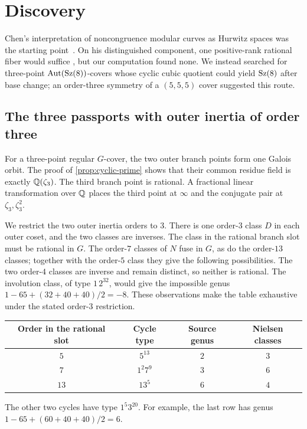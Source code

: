 \section{Discovery}\label{sec:construction}

Chen's interpretation of noncongruence modular curves as Hurwitz spaces
was the starting point~\cite[\S5.4]{Chen2025}. On his distinguished
component, one positive-rank rational fiber would suffice
\cite[Proposition~5.6 and the following remark]{Chen2025}, but our
computation found none. We instead searched for three-point
$\operatorname{Aut}(\operatorname{Sz}(8))$-covers whose cyclic cubic quotient could yield $\operatorname{Sz}(8)$
after base change; an order-three symmetry of a $(5,5,5)$ cover suggested
this route.

\subsection{The three passports with outer inertia of order three}\label{sec:passports}

For a three-point regular $G$-cover, the two outer branch points form one
Galois orbit. The proof of \cref{prop:cyclic-prime} shows that their common
residue field is exactly $\mathbb{Q}(\zeta_3)$. The third branch point is rational.
A fractional linear transformation over $\mathbb{Q}$ places the third point at
$\infty$ and the conjugate pair at $\zeta_3,\zeta_3^2$.

We restrict the two outer inertia orders to $3$. There is one order-$3$
class $D$ in each outer coset, and the two classes are inverses. The class
in the rational branch slot must be rational in $G$. The order-$7$
classes of $N$ fuse in $G$, as do the order-$13$ classes; together with the
order-$5$ class they give the following possibilities. The two order-$4$
classes are inverse and remain distinct, so neither is rational. The
involution class, of type $1\,2^{32}$, would give the impossible genus
$1-65+(32+40+40)/2=-8$. These observations make the table exhaustive
under the stated order-$3$ restriction.

\begin{center}
\begin{tabular}{@{}cccc@{}}
\toprule
Order in the rational slot&Cycle type&Source genus&Nielsen classes\\
\midrule
$5$&$5^{13}$&$2$&$3$\\
$7$&$1^2 7^9$&$3$&$6$\\
$13$&$13^5$&$6$&$4$\\
\bottomrule
\end{tabular}
\end{center}
The other two cycles have type $1^5 3^{20}$. For example, the last row has
genus $1-65+(60+40+40)/2=6$.

